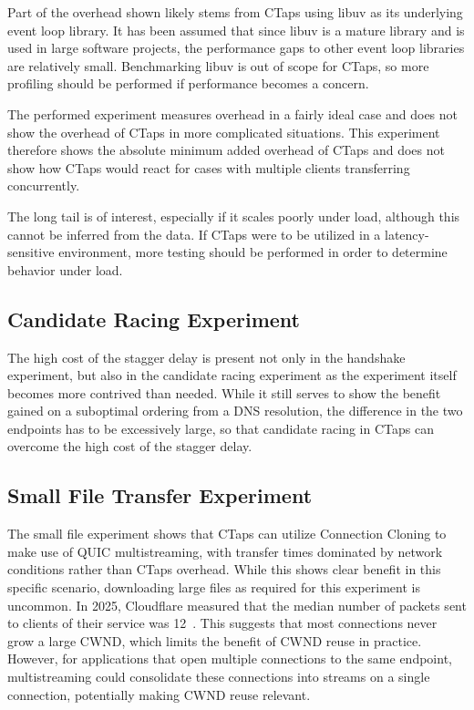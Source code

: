 Part of the overhead shown likely stems from CTaps using libuv as
its underlying event loop library. It has been assumed that since libuv
is a mature library and is used in large software projects, the performance gaps to other
event loop libraries are relatively small. Benchmarking libuv
is out of scope for CTaps, so more profiling should be performed
if performance becomes a concern.

The performed experiment measures overhead in a fairly ideal case and
does not show the overhead of CTaps
in more complicated situations. This experiment therefore
shows the absolute minimum added overhead of CTaps and does not show
how CTaps would react for cases with multiple clients transferring
concurrently.

The long tail is of interest, especially if it scales poorly under
load, although this cannot be inferred from the data. If CTaps were to
be utilized in a latency-sensitive environment, more testing should be
performed in order to determine behavior under load.

\subsection{Candidate Racing Experiment}
The high cost of the stagger delay is present not only in the handshake experiment,
but also in the candidate racing experiment as the experiment itself becomes
more contrived than needed. While it still serves to
show the benefit gained on a suboptimal ordering from a DNS resolution, the difference in the two endpoints has to be
excessively large, so that candidate racing in CTaps can overcome the high cost of the stagger delay.

\subsection{Small File Transfer Experiment}
The small file experiment shows that CTaps can utilize Connection
Cloning to make use of QUIC multistreaming, with transfer times
dominated by network conditions rather than CTaps overhead.
While this shows clear benefit in
this specific scenario, downloading large files as required for
this experiment is uncommon. In 2025, Cloudflare
measured that the median number of packets sent to clients of their service
was 12~\cite{sulemanahmadMeasuringCharacteristicsTCP2025}.
This suggests that most connections never grow a large CWND,
which limits the benefit of CWND reuse in practice. However, for applications
that open multiple connections to the same endpoint, multistreaming could
consolidate these connections into streams on a single connection,
potentially making CWND reuse relevant.

